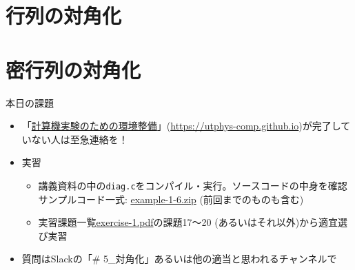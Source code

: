 \documentclass[10pt,dvipdfmx]{beamer}
\begin{document}
\section{行列の対角化}


%






\section{密行列の対角化}











\begin{frame}[t]{本日の課題}
  \begin{itemize}
  \item 「\href{https://utphys-comp.github.io}{計算機実験のための環境整備}」({\small \href{https://utphys-comp.github.io}{https://utphys-comp.github.io}})が完了していない人は至急連絡を！
  \item 実習
    \begin{itemize}
    \item 講義資料の中の{\tt diag.c}をコンパイル・実行。ソースコードの中身を確認 \\
      サンプルコード一式: \href{https://github.com/todo-group/ComputerExperiments/releases/tag/2020s-computer1}{example-1-6.zip} (前回までのものも含む)
    \item 実習課題一覧\href{https://github.com/todo-group/ComputerExperiments/releases/tag/2020s-computer1}{exercise-1.pdf}の課題17〜20 (あるいはそれ以外)から適宜選び実習
    \end{itemize}
  \item 質問はSlackの「\# 5\_対角化」あるいは他の適当と思われるチャンネルで \\[2em]
  \end{itemize}
\end{frame}
\end{document}
